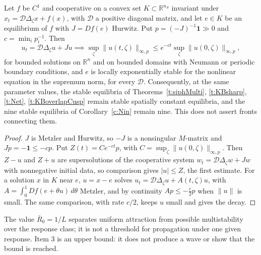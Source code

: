 Let $f$ be $C^1$ and cooperative on a convex set $K\subset\mathbb R^{n_S}$ invariant under $x_t=\mathcal D\Delta_\zeta x+f(x)$, with $\mathcal D$ a positive diagonal matrix, and let $e\in K$ be an equilibrium of $f$ with $J=Df(e)$ Hurwitz. Put $p=(-J)^{-1}\mathbf1\gg0$ and $c=\min_ip_i^{-1}$. Then
\[
 u_t=\mathcal D\Delta_\zeta u+Ju\implies\sup_\zeta\|u(t,\zeta)\|_{\infty,p}\le e^{-ct}\sup_\zeta\|u(0,\zeta)\|_{\infty,p},
\]
for bounded solutions on $\mathbb R^n$ and on bounded domains with Neumann or periodic boundary conditions, and $e$ is locally exponentially stable for the nonlinear equation in the supremum norm, for every $\mathcal D$. Consequently, at the same parameter values, the stable equilibria of Theorems~\ref{t:siphMulti}, \ref{t:KBsharp}, \ref{t:Net}, \ref{t:KBoverlapCusp} remain stable spatially constant equilibria, and the nine stable equilibria of Corollary~\ref{c:Nin} remain nine. This does not assert fronts connecting them.
\eeC
\begin{proof}
$J$ is Metzler and Hurwitz, so $-J$ is a nonsingular $M$-matrix and $Jp=-\mathbf1\le-cp$. Put $Z(t)=Ce^{-ct}p$, with $C=\sup_\zeta\|u(0,\zeta)\|_{\infty,p}$. Then $Z-u$ and $Z+u$ are supersolutions of the cooperative system $w_t=\mathcal D\Delta_\zeta w+Jw$ with nonnegative initial data, so comparison gives $|u|\le Z$, the first estimate. For a solution $x$ in $K$ near $e$, $u=x-e$ solves $u_t=\mathcal D\Delta_\zeta u+A(t,\zeta)u$, with $A=\int_0^1Df(e+\theta u)\,d\theta$ Metzler, and by continuity $Ap\le-\frac c2p$ when $\|u\|$ is small. The same comparison, with rate $c/2$, keeps $u$ small and gives the decay.
\end{proof}

The value $\bar R_0=1/L$ separates uniform attraction from possible multistability over the response class; it is not a threshold for propagation under one given response. Item 3 is an upper bound: it does not produce a wave or show that the bound is reached.

